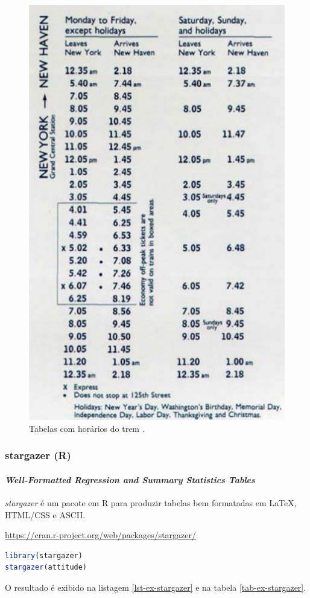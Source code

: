 \begin{frame}
\begin{figure}[htbp]
\begin{minipage}[t]{0.47\textwidth}
\includegraphics[width=0.7\linewidth,height=0.7\textheight,keepaspectratio]{figures/timetable02.png}
\end{minipage}
\caption{Tabelas com horários do trem \cite{tufte_envisioning_1990}.}
\end{figure}
\end{frame}

\begin{frame}
\frametitle{stargazer (R)}
\framesubtitle{\emph{Well-Formatted Regression and Summary Statistics Tables}}

\emph{stargazer} é um pacote em R para produzir tabelas bem formatadas em \LaTeX{},
HTML/CSS e ASCII.

\url{https://cran.r-project.org/web/packages/stargazer/}


\begin{lstlisting}[language=R, label=lst-stargazer, caption={Exemplos de utilização do stargazer}, postbreak=\mbox{$\hookrightarrow$\space}, basicstyle=\fontsize{8}{10}\selectfont\ttfamily]
library(stargazer)
stargazer(attitude)
\end{lstlisting}

O resultado é exibido na listagem \ref{lst-ex-stargazer} e na tabela \ref{tab-ex-stargazer}.



\framebreak


\end{frame}


